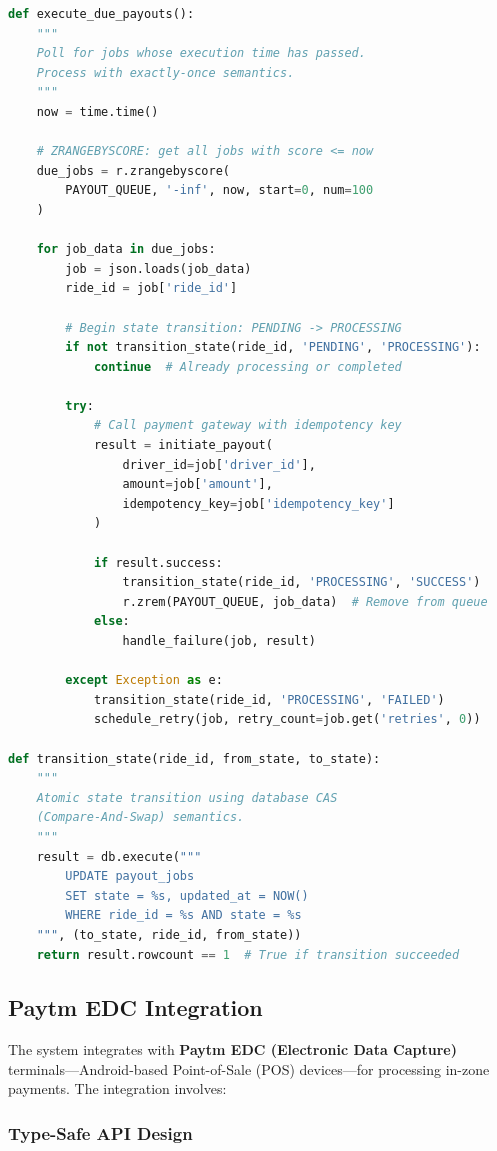 \documentclass[12pt,a4paper,oneside]{report}
\begin{document}
\begin{lstlisting}[language=Python, caption={Payout Executor with State Machine}]
def execute_due_payouts():
    """
    Poll for jobs whose execution time has passed.
    Process with exactly-once semantics.
    """
    now = time.time()

    # ZRANGEBYSCORE: get all jobs with score <= now
    due_jobs = r.zrangebyscore(
        PAYOUT_QUEUE, '-inf', now, start=0, num=100
    )

    for job_data in due_jobs:
        job = json.loads(job_data)
        ride_id = job['ride_id']

        # Begin state transition: PENDING -> PROCESSING
        if not transition_state(ride_id, 'PENDING', 'PROCESSING'):
            continue  # Already processing or completed

        try:
            # Call payment gateway with idempotency key
            result = initiate_payout(
                driver_id=job['driver_id'],
                amount=job['amount'],
                idempotency_key=job['idempotency_key']
            )

            if result.success:
                transition_state(ride_id, 'PROCESSING', 'SUCCESS')
                r.zrem(PAYOUT_QUEUE, job_data)  # Remove from queue
            else:
                handle_failure(job, result)

        except Exception as e:
            transition_state(ride_id, 'PROCESSING', 'FAILED')
            schedule_retry(job, retry_count=job.get('retries', 0))

def transition_state(ride_id, from_state, to_state):
    """
    Atomic state transition using database CAS
    (Compare-And-Swap) semantics.
    """
    result = db.execute("""
        UPDATE payout_jobs
        SET state = %s, updated_at = NOW()
        WHERE ride_id = %s AND state = %s
    """, (to_state, ride_id, from_state))
    return result.rowcount == 1  # True if transition succeeded
\end{lstlisting}

\subsection{Paytm EDC Integration}

The system integrates with \textbf{Paytm EDC (Electronic Data Capture)} terminals—Android-based Point-of-Sale (POS) devices—for processing in-zone payments. The integration involves:

\subsubsection{Type-Safe API Design}
\end{document}
